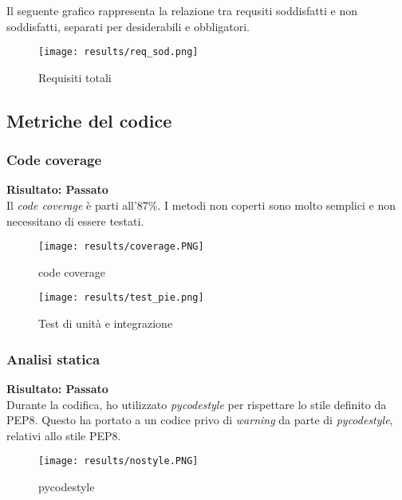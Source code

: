 Il seguente grafico rappresenta la relazione tra requsiti soddisfatti e non soddisfatti, separati per desiderabili e obbligatori.
\begin{figure}[H]
    \centering
    \texttt{[image: results/req\_sod.png]}
    \caption{Requisiti totali}
    \label{img:req_totali}
\end{figure}

\subsection{Metriche del codice} %
\subsubsection{Code coverage} %
\textbf{Risultato: Passato}\\
Il \textit{code coverage} è parti all'87\%. I metodi non coperti sono molto semplici e non necessitano di essere testati. 
\begin{figure}[H]
    \centering
    \texttt{[image: results/coverage.PNG]} 
    \caption{code coverage}
    \label{coverage}
\end{figure}
\begin{figure}[H]
    \centering
    \texttt{[image: results/test\_pie.png]} 
    \caption{Test di unità e integrazione}
    \label{img:unittests}
\end{figure}

\subsubsection{Analisi statica} %
\textbf{Risultato: Passato}\\
Durante la codifica, ho utilizzato \textit{pycodestyle} per rispettare lo stile definito da PEP8. Questo ha portato a un codice privo di \textit{warning} da parte di \textit{pycodestyle}, relativi allo stile PEP8.
\begin{figure}[H]
    \centering
    \texttt{[image: results/nostyle.PNG]} 
    \caption{pycodestyle}
    \label{coverage}
\end{figure}

